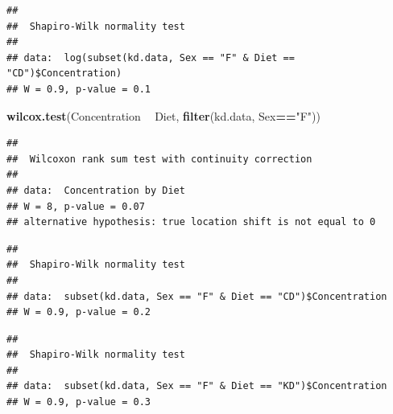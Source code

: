 \documentclass[]{article}
\newenvironment{Shaded}{\begin{snugshade}}{\end{snugshade}}
\newcommand{\KeywordTok}[1]{\textcolor[rgb]{0.13,0.29,0.53}{\textbf{#1}}}
\newcommand{\NormalTok}[1]{#1}
\newcommand{\OperatorTok}[1]{\textcolor[rgb]{0.81,0.36,0.00}{\textbf{#1}}}
\newcommand{\StringTok}[1]{\textcolor[rgb]{0.31,0.60,0.02}{#1}}
\begin{document}
\begin{verbatim}
## 
##  Shapiro-Wilk normality test
## 
## data:  log(subset(kd.data, Sex == "F" & Diet == "CD")$Concentration)
## W = 0.9, p-value = 0.1
\end{verbatim}

\begin{Shaded}
\begin{Highlighting}[]
\KeywordTok{wilcox.test}\NormalTok{(Concentration }\OperatorTok{~}\StringTok{ }\NormalTok{Diet, }\KeywordTok{filter}\NormalTok{(kd.data, Sex}\OperatorTok{==}\StringTok{"F"}\NormalTok{)) }
\end{Highlighting}
\end{Shaded}

\begin{verbatim}
## 
##  Wilcoxon rank sum test with continuity correction
## 
## data:  Concentration by Diet
## W = 8, p-value = 0.07
## alternative hypothesis: true location shift is not equal to 0
\end{verbatim}

\begin{Shaded}
\end{Shaded}

\begin{verbatim}
## 
##  Shapiro-Wilk normality test
## 
## data:  subset(kd.data, Sex == "F" & Diet == "CD")$Concentration
## W = 0.9, p-value = 0.2
\end{verbatim}

\begin{Shaded}
\end{Shaded}

\begin{verbatim}
## 
##  Shapiro-Wilk normality test
## 
## data:  subset(kd.data, Sex == "F" & Diet == "KD")$Concentration
## W = 0.9, p-value = 0.3
\end{verbatim}
\end{document}
